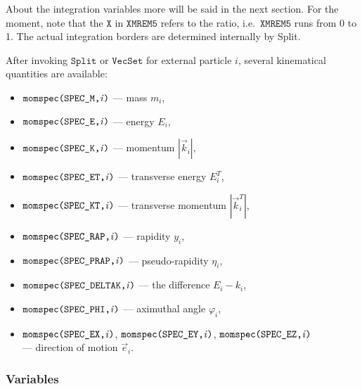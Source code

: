 \documentclass[twoside,11pt]{article}
\def\Var#1{\ensuremath{\mathit{#1}}}
\def\Vi{\Var{i}}
\def\Code#1{\ensuremath{\texttt{#1}}}
\def\ie{i.e.\ }
\def\uscore{\symbol{95}}
\begin{document}
About the integration variables more will be said in the next section. 
For the moment, note that the \Code{X} in \Code{XMREM5} refers to
the ratio, \ie \Code{XMREM5} runs from 0 to 1.  The actual integration
borders are determined internally by Split.

After invoking \Code{Split} or \Code{VecSet} for external particle \Vi, 
several kinematical quantities are available:
\begin{itemize}
\item	\Code{momspec(SPEC\uscore M,\Vi)}
	--- mass $m_i$,

\item	\Code{momspec(SPEC\uscore E,\Vi)}
	--- energy $E_i$,

\item	\Code{momspec(SPEC\uscore K,\Vi)}
	--- momentum $|\vec k_i|$,

\item	\Code{momspec(SPEC\uscore ET,\Vi)}
	--- transverse energy $E_i^T$,

\item	\Code{momspec(SPEC\uscore KT,\Vi)}
	--- transverse momentum $|\vec k_i^T|$,

\item	\Code{momspec(SPEC\uscore RAP,\Vi)}
	--- rapidity $y_i$,

\item	\Code{momspec(SPEC\uscore PRAP,\Vi)}
	--- pseudo-rapidity $\eta_i$,

\item	\Code{momspec(SPEC\uscore DELTAK,\Vi)}
	--- the difference $E_i - k_i$,

\item	\Code{momspec(SPEC\uscore PHI,\Vi)}
	--- aximuthal angle $\varphi_i$,

\item	\Code{momspec(SPEC\uscore EX,\Vi)},
	\Code{momspec(SPEC\uscore EY,\Vi)},
	\Code{momspec(SPEC\uscore EZ,\Vi)} \\
	--- direction of motion $\vec e_i$.
\end{itemize}


\subsubsection{Variables}
\end{document}
